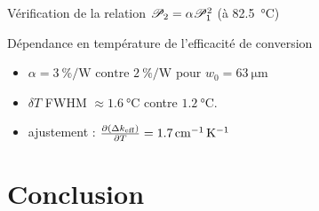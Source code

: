 \documentclass{beamer}
\newcommand{\dke}{\Delta k_\mathsc{eff}}
\begin{document}
\begin{frame}{Vérification de la relation $\P_2 = \alpha \P_1^2$ (à \SI{82.5}{\celsius})} 
\centering

\end{frame}

\begin{frame}{Dépendance en température de l'efficacité de conversion}
\centering

\vspace*{-1.3cm}
\begin{itemize}[<+->]
\item $\alpha=\SI{3}{\percent\per\watt} \text{ contre } \SI{2}{\percent\per\watt}$ pour $w_0 = \SI{63}{\micro\meter}$
\item $\delta T$ FWHM $\approx\SI{1.6}{\celsius}$ contre $\SI{1.2}{\celsius}$.
\item ajustement : $\pdv{\left(\dke\right)}{T}=\SI{1.7}{\per\centi\meter\per\kelvin}$
\end{itemize}
\end{frame}

\section{Conclusion}
\end{document}
